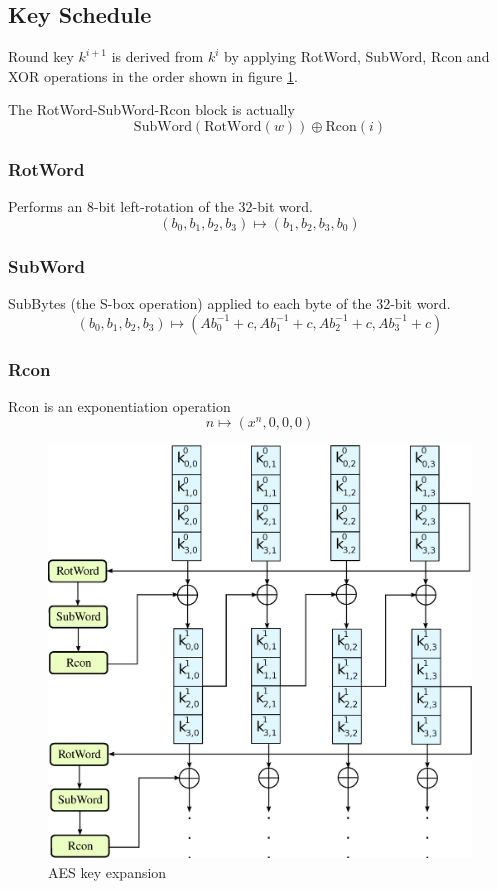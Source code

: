 \documentclass[a4paper]{scrartcl}
\begin{document}
\subsection{Key Schedule}

Round key $k^{i+1}$ is derived from $k^{i}$ by applying RotWord, SubWord, Rcon and XOR operations
in the order shown in figure \ref{aesschedule}.

The RotWord-SubWord-Rcon block is actually
\[\mathrm{SubWord}(\mathrm{RotWord}(w))\oplus \mathrm{Rcon}(i)\]

\subsubsection{RotWord}

Performs an 8-bit left-rotation of the 32-bit word.
\[(b_0,b_1,b_2,b_3)\mapsto(b_1,b_2,b_3,b_0)\]

\subsubsection{SubWord}

SubBytes (the S-box operation) applied to each byte of the 32-bit word.
\[(b_0,b_1,b_2,b_3)\mapsto(Ab_0^{-1}+c,Ab_1^{-1}+c,Ab_2^{-1}+c,Ab_3^{-1}+c)\]

\subsubsection{Rcon}

Rcon is an exponentiation operation
\[n\mapsto (x^n, 0, 0, 0)\]

\begin{figure}
    \centering
    \includegraphics[scale=0.3]{images/aes-schedule.eps}
    \caption{AES key expansion}
    \label{aesschedule}
\end{figure}
\end{document}
